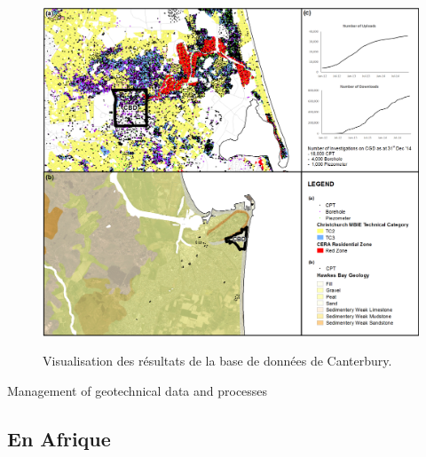        
        \begin{figure}[t]
        \centering
        \includegraphics[width=1\textwidth]{cgd.png}
        \label{image-cdg}
        \caption{Visualisation des résultats de la base de données de Canterbury.}
        \end{figure}
        Management of geotechnical data and processes
         \paragraph{}

         \subsection{En Afrique}
